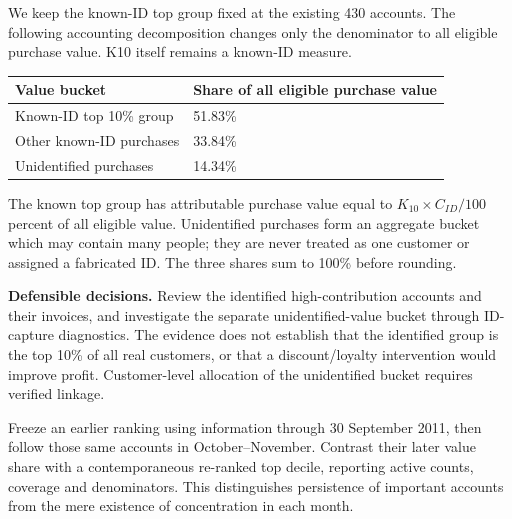\documentclass[10pt,a4paper]{article}
\newcommand{\subhead}[1]{\vspace{.2em}{\bfseries #1}\par}
\begin{document}
\subhead{Initial decomposition of value scope}
We keep the known-ID top group fixed at the existing 430 accounts. The following accounting decomposition changes only the denominator to all eligible purchase value. K10 itself remains a known-ID measure.

\begin{tabularx}{\linewidth}{@{}YY@{}}
\toprule
\textbf{Value bucket} & \textbf{Share of all eligible purchase value} \\ \midrule
Known-ID top 10\% group & 51.83\% \\
Other known-ID purchases & 33.84\% \\
Unidentified purchases & 14.34\% \\
\bottomrule\end{tabularx}

The known top group has attributable purchase value equal to $K_{10}\times C_{ID}/100$ percent of all eligible value. Unidentified purchases form an aggregate bucket which may contain many people; they are never treated as one customer or assigned a fabricated ID. The three shares sum to 100\% before rounding.

\textbf{Defensible decisions.} Review the identified high-contribution accounts and their invoices, and investigate the separate unidentified-value bucket through ID-capture diagnostics. The evidence does not establish that the identified group is the top 10\% of all real customers, or that a discount/loyalty intervention would improve profit. Customer-level allocation of the unidentified bucket requires verified linkage.

\subhead{Planned temporal and cohort extension}
Freeze an earlier ranking using information through 30 September 2011, then follow those same accounts in October--November. Contrast their later value share with a contemporaneous re-ranked top decile, reporting active counts, coverage and denominators. This distinguishes persistence of important accounts from the mere existence of concentration in each month.
\end{document}
